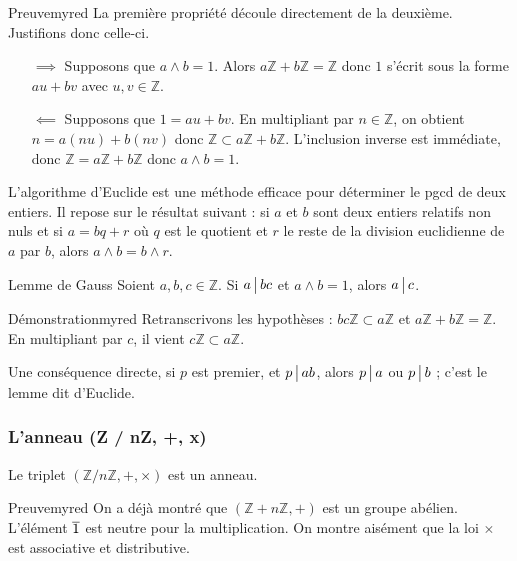     \begin{demo}{Preuve}{myred}
        La première propriété découle directement de la deuxième. Justifions donc celle-ci.
        \begin{itemize}
            \item[$\implies$] Supposons que $a \wedge b = 1$. Alors $a \mathbb{Z} + b \mathbb{Z} = \mathbb{Z}$ donc $1$ s’écrit sous la forme $au + bv$ avec $u,v \in \mathbb{Z}$.
            \item[$\impliedby$] Supposons que $1 = au + bv$. En multipliant par $n \in \mathbb{Z}$, on obtient $n = a(nu) + b(nv)$ donc $\mathbb{Z} \subset a \mathbb{Z} + b \mathbb{Z}$. L’inclusion inverse est immédiate, donc $\mathbb{Z} = a \mathbb{Z} + b \mathbb{Z}$ donc $a \wedge b = 1$. 
        \end{itemize}
    \end{demo}

    L’algorithme d’Euclide est une méthode efficace pour déterminer le pgcd de deux entiers. Il repose sur le résultat suivant : si $a$ et $b$ sont deux entiers relatifs non nuls et si $a = bq + r$ où $q$ est le quotient et $r$ le reste de la division euclidienne de $a$ par $b$, alors $a \wedge b = b \wedge r$.

    \begin{theo}{Lemme de Gauss}{}
        Soient $a,b,c \in \mathbb{Z}$. Si $a \, \big| \, bc$ et $a \wedge b = 1$, alors $a \, \big| \, c$.
    \end{theo}

    \begin{demo}{Démonstration}{myred}
        Retranscrivons les hypothèses : $bc \mathbb{Z} \subset a \mathbb{Z}$ et $a \mathbb{Z} + b \mathbb{Z} = \mathbb{Z}$. En multipliant par $c$, il vient $c \mathbb{Z} \subset a \mathbb{Z}$.
    \end{demo}

    Une conséquence directe, si $p$ est premier, et $p \, \big| \, ab$, alors $p \, \big| \, a$ ou $p \, \big| \, b$ ; c’est le lemme dit d’Euclide. 

    \subsubsection{L’anneau (Z / nZ, +, x)}

    \begin{theo}{}{}
        Le triplet $(\mathbb{Z} / n \mathbb{Z}, +, \times)$ est un anneau.
    \end{theo}

    \begin{demo}{Preuve}{myred}
        On a déjà montré que $(\mathbb{Z} + n \mathbb{Z}, +)$ est un groupe abélien. L’élément $\overline{1}$ est neutre pour la multiplication. On montre aisément que la loi $\times$ est associative et distributive.
    \end{demo}

